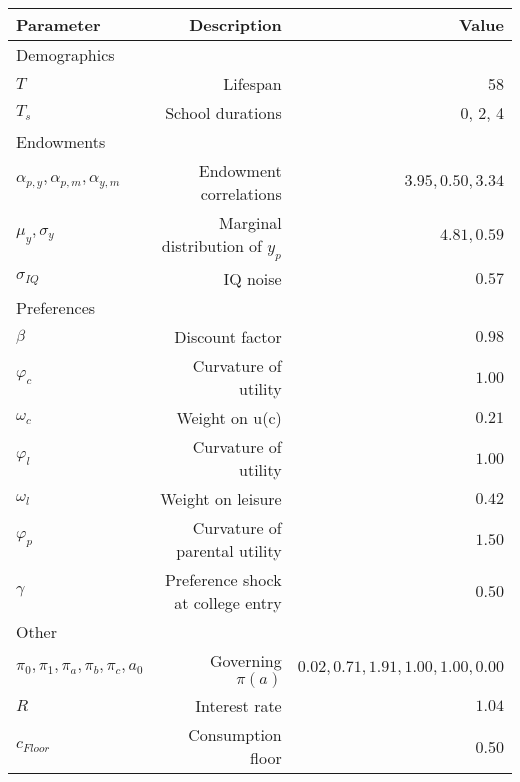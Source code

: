 \begin{tabular}{lrr}
\hline
Parameter & Description  & Value  \\
\hline
Demographics &   &   \\
$T$ & Lifespan  & 58  \\
$T_{s}$ & School durations  & 0, 2, 4  \\
Endowments &   &   \\
$\alpha_{p,y}, \alpha_{p,m}, \alpha_{y,m}$ & Endowment correlations  & $3.95, 0.50, 3.34$  \\
$\mu_{y}, \sigma_{y}$ & Marginal distribution of $y_{p}$  & $4.81, 0.59$  \\
$\sigma_{IQ}$ & IQ noise  & $0.57$  \\
Preferences &   &   \\
$\beta$ & Discount factor  & $0.98$  \\
$\varphi_{c}$ & Curvature of utility  & $1.00$  \\
$\omega_{c}$ & Weight on u(c)  & $0.21$  \\
$\varphi_{l}$ & Curvature of utility  & $1.00$  \\
$\omega_{l}$ & Weight on leisure  & $0.42$  \\
$\varphi_{p}$ & Curvature of parental utility  & $1.50$  \\
$\gamma$ & Preference shock at college entry  & $0.50$  \\
Other &   &   \\
$\pi_{0}, \pi_{1}, \pi_{a}, \pi_{b}, \pi_{c}, a_{0}$ & Governing $\pi(a)$  & $0.02, 0.71, 1.91, 1.00, 1.00, 0.00$  \\
$R$ & Interest rate  & $1.04$  \\
$c_{Floor}$ & Consumption floor  & 0.50  \\
\hline
\end{tabular}%
